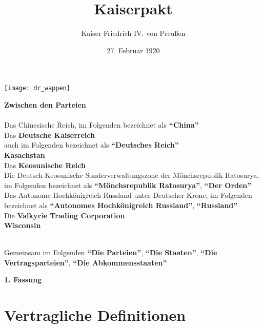 \documentclass{article}
\title{Kaiserpakt}
\author{Kaiser Friedrich IV. von Preußen}
\date{27. Februar 1920}
\begin{document}
\maketitle
\begin{center}
    \texttt{[image: dr\_wappen]}
\end{center}
\begin{center}
    \textbf{Zwischen den Parteien\\}\textbf{\\}
    Das Chinesische Reich, im Folgenden bezeichnet als \textbf{``China''\\}
    Das \textbf{Deutsche Kaiserreich\\} auch im Folgenden bezeichnet als \textbf{``Deutsches Reich''\\}
    \textbf{Kasachstan\\}
    Das \textbf{Keosunische Reich\\}
    Die Deutsch-Keosunische Sonderverwaltungszone der Mönchsrepublik Ratosurya, im Folgenden bezeichnet als \textbf{``Mönchsrepublik Ratosurya''}, \textbf{``Der Orden''\\}
    Das Autonome Hochkönigreich Russland unter Deutscher Krone, im Folgenden bezeichnet als \textbf{``Autonomes Hochkönigreich Russland''}, \textbf{``Russland''\\}
    Die \textbf{Valkyrie Trading Corporation\\}
    \textbf{Wisconsin\\}\textbf{\\}

    Gemeinsam im Folgenden \textbf{``Die Parteien''}, \textbf{``Die Staaten''}, \textbf{``Die Vertragsparteien''}, \textbf{``Die Abkommensstaaten''}
\end{center}
\newpage
{}
\vspace*{\fill}
\begin{Center}
\textbf{1. Fassung}
\vspace*{\fill}
\end{Center}
\newpage
\tableofcontents
\newpage
\section{Vertragliche Definitionen}
\end{document}
